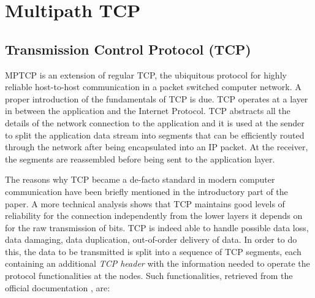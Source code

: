 \chapter{Multipath TCP}
\label{chap:multipathtcp}

\section{Transmission Control Protocol (TCP)}
MPTCP is an extension of regular TCP, the ubiquitous protocol for highly reliable host-to-host communication in a packet switched computer network. A proper introduction of the fundamentals of TCP is due.
TCP operates at a layer in between the application and the Internet Protocol. TCP abstracts all the details of the network connection to the application and it is used at the sender to split the application data stream into segments that can be efficiently routed through the network after being encapsulated into an IP packet. At the receiver, the segments are reassembled before being sent to the application layer.

The reasons why TCP became a de-facto standard in modern computer communication have been briefly mentioned in the introductory part of the paper. A more technical analysis shows that TCP maintains good levels of reliability for the connection independently from the lower layers it depends on for the raw transmission of bits. TCP is indeed able to handle possible data loss, data damaging, data duplication, out-of-order delivery of data. In order to do this, the data to be transmitted is split into a sequence of TCP segments, each containing an additional \textit{TCP header} with the information needed to operate the protocol functionalities at the nodes. Such functionalities, retrieved from the official documentation \cite{rfc793}, are:

